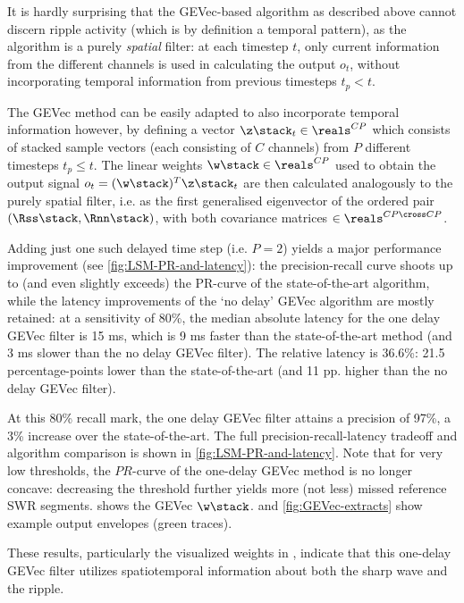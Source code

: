 \label{sec:spatiotemporal}

It is hardly surprising that the GEVec-based algorithm as described above cannot discern ripple activity (which is by definition a temporal pattern), as the algorithm is a purely \emph{spatial} filter: at each timestep $t$, only current information from the different channels is used in calculating the output $o_t$, without incorporating temporal information from previous timesteps $t_p < t$.

The GEVec method can be easily adapted to also incorporate temporal information however, by defining a vector $\z\stack_t \in \reals^{CP}$ which consists of stacked sample vectors (each consisting of $C$ channels) from $P$ different timesteps $t_p \leq t$. The linear weights $\w\stack \in \reals^{CP}$ used to obtain the output signal $o_t = (\w\stack)^T \z\stack_t$ are then calculated analogously to the purely spatial filter, i.e. as the first generalised eigenvector of the ordered pair $(\Rss\stack, \Rnn\stack)$, with both covariance matrices $\in \reals^{CP \cross CP}$.

Adding just one such delayed time step (i.e. $P = 2$) yields a major performance improvement (see \cref{fig:LSM-PR-and-latency}): the precision-recall curve shoots up to (and even slightly exceeds) the PR-curve of the state-of-the-art algorithm, while the latency improvements of the `no delay' GEVec algorithm are mostly retained: at a sensitivity of 80\%, the median absolute latency for the one delay GEVec filter is 15 ms, which is 9 ms faster than the state-of-the-art method (and 3 ms slower than the no delay GEVec filter). The relative latency is 36.6\%: 21.5 percentage-points lower than the state-of-the-art (and 11 pp. higher than the no delay GEVec filter).

At this 80\% recall mark, the one delay GEVec filter attains a precision of 97\%, a 3\% increase over the state-of-the-art. The full precision-recall-latency tradeoff and algorithm comparison is shown in \cref{fig:LSM-PR-and-latency}. Note that for very low thresholds, the $PR$-curve of the one-delay GEVec method is no longer concave: decreasing the threshold further yields more (not less) missed reference SWR segments.  shows the GEVec $\w\stack$.  and \cref{fig:GEVec-extracts} show example output envelopes (green traces).

These results, particularly the visualized weights in , indicate that this one-delay GEVec filter utilizes spatiotemporal information about both the sharp wave and the ripple.
